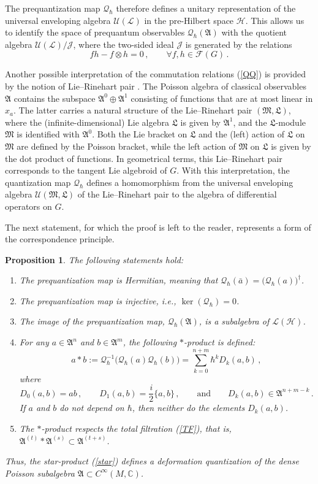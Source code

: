 \documentclass[12pt,a4paper]{article}
\numberwithin{equation}{section}
\theoremstyle{theorem}
\newtheorem{proposition}[]{Proposition}
\theoremstyle{remark}
\newcommand{\hh}{\mathcal{H}}
\newcommand{\fg}{\mathcal{F}(G)}
\newcommand{\fa}{\mathfrak{A}}
\newcommand{\qq}{\mathcal{Q}_{\hbar}}
\newcommand{\cc}{\mathbb{C}}
\begin{document}
The prequantization map $\qq$ therefore defines a unitary representation of the universal enveloping algebra $\mathcal{U}(\mathcal{L})$ in the pre-Hilbert space $\hh$. This allows us to identify the space of prequantum observables $\qq(\fa)$ with the quotient algebra $\mathcal{U}(\mathcal{L})/\mathcal{J}$, where the two-sided ideal $\mathcal{J}$ is generated by the relations 
 $$
 fh-f\otimes h=0\,,\qquad \forall f,h\in \fg\,.
 $$

Another possible interpretation of the commutation  relations (\ref{QQ}) is provided by the notion of Lie--Rinehart pair 
\cite{LR}. The Poisson algebra of classical observables $\fa$ contains the subspace $\fa^0\oplus\fa^1$ consisting of functions that are at most linear in $x_a$. The latter carries a natural structure of the Lie--Rinehart pair $(\mathfrak{M}, \mathfrak{L})$, where the (infinite-dimensional) Lie algebra $\mathfrak{L}$ is given by $\mathfrak{A}^1$, and the $\mathfrak{L}$-module $\mathfrak{M}$ is identified with $\mathfrak{A}^0$. Both the Lie bracket on $\mathfrak{L}$ and the (left) action of $\mathfrak{L}$ on $\mathfrak{M}$ are defined by the Poisson bracket, while the left action of $\mathfrak{M}$ on $\mathfrak{L}$ is given by the dot  product  of functions. In geometrical terms, this Lie--Rinehart pair corresponds to the tangent Lie algebroid of $G$. 
With this interpretation,  the quantization map $\qq$ defines a homomorphism from the universal enveloping algebra $\mathcal{U}(\mathfrak{M},\mathfrak{L})$ of the Lie--Rinehart pair to the algebra of differential operators on $G$. 

 
 The next statement, for which the proof is left to the reader, represents a form of the correspondence principle. 
\begin{proposition} \label{P3} The following statements hold:
\begin{enumerate}
 \item The prequantization map is Hermitian, meaning that $\qq(\bar a)=\big(\qq(a)\big)^\dagger$.
    \item The prequantization map is injective, i.e., $\ker(\qq)=0$.
    \item The image of the prequantization map, $\qq(\fa) $, is a subalgebra of $\mathscr{L}(\hh)$.   
    \item For any $a\in \fa^n$ and $b\in\fa^m$, the following $\ast$-product is defined:
\begin{equation}\label{star}
    a\ast b:=\qq^{-1}\big(  \qq(a)\qq(b)\big)= \sum_{k=0}^{n+m}  \hbar^k D_k(a,b)\,,
\end{equation}
       where 
       $$
        D_0(a,b)=ab\,,\qquad D_1(a,b)=\frac i2\{a,b\}\,,\qquad\mbox{and}\qquad    D_k(a,b)\in\fa^{n+m-k}\,.  
        $$
   If $a$ and $b$ do not depend on $\hbar$, then neither do the elements $D_k(a,b)$. 
   \item The $\ast$-product respects the total filtration (\ref{TF}), that is,
   $
       \fa^{(t)}\ast \fa^{(s)}\subset \fa^{(t+s)}
   $.
   \end{enumerate}
   Thus, the star-product (\ref{star}) defines a deformation quantization of the dense Poisson subalgebra $\fa\subset C^\infty(M,\cc)$.  \end{proposition}
\end{document}
